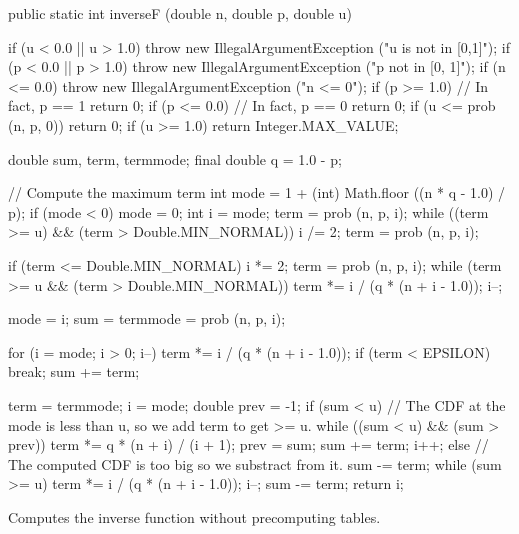 \begin{code}

   public static int inverseF (double n, double p, double u)\begin{hide} {
      if (u < 0.0 || u > 1.0)
         throw new IllegalArgumentException ("u is not in [0,1]");
      if (p < 0.0 || p > 1.0)
         throw new IllegalArgumentException ("p not in [0, 1]");
      if (n <= 0.0)
         throw new IllegalArgumentException ("n <= 0");
      if (p >= 1.0)                  // In fact, p == 1
         return 0;
      if (p <= 0.0)                  // In fact, p == 0
         return 0;
      if (u <= prob (n, p, 0))
         return 0;
      if (u >= 1.0)
         return Integer.MAX_VALUE;

      double sum, term, termmode;
      final double q = 1.0 - p;

      // Compute the maximum term
      int mode = 1 + (int) Math.floor ((n * q - 1.0) / p);
      if (mode < 0)
         mode = 0;
      int i = mode;
      term = prob (n, p, i);
      while ((term >= u) && (term > Double.MIN_NORMAL)) {
         i /= 2;
         term = prob (n, p, i);
      }

      if (term <= Double.MIN_NORMAL) {
         i *= 2;
         term = prob (n, p, i);
         while (term >= u && (term > Double.MIN_NORMAL)) {
            term *= i / (q * (n + i - 1.0));
            i--;
         }
      }

      mode = i;
      sum = termmode = prob (n, p, i);

      for (i = mode; i > 0; i--) {
         term *= i / (q * (n + i - 1.0));
         if (term < EPSILON)
            break;
         sum += term;
      }

      term = termmode;
      i = mode;
      double prev = -1;
      if (sum < u) {
         // The CDF at the mode is less than u, so we add term to get >= u.
         while ((sum < u) && (sum > prev)){
            term *= q * (n + i) / (i + 1);
            prev = sum;
            sum += term;
            i++;
         }
      } else {
         // The computed CDF is too big so we substract from it.
         sum -= term;
         while (sum >= u) {
            term *= i / (q * (n + i - 1.0));
            i--;
            sum -= term;
         }
      }
      return i;
   }\end{hide}
\end{code}
\begin{tabb}  Computes the inverse function without precomputing tables.
\end{tabb}
